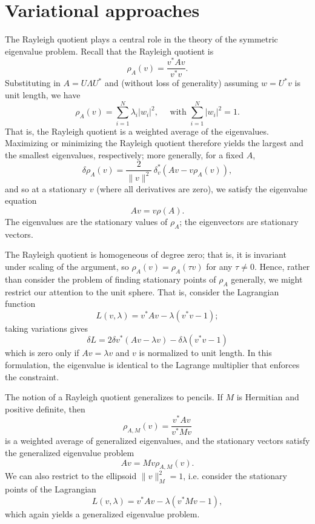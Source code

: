 \documentclass[12pt, leqno]{article} %
\begin{document}
\section{Variational approaches}


The Rayleigh quotient plays a central role in the theory of the
symmetric eigenvalue problem.  Recall that the Rayleigh quotient is
\[
  \rho_A(v) = \frac{v^* A v}{v^* v}.
\]
Substituting in $A = U \Lambda U^*$ and (without loss of generality)
assuming $w = U^* v$ is unit length, we have
\[
  \rho_A(v) = \sum_{i=1}^N \lambda_i |w_i|^2, \quad
  \mbox{ with } \sum_{i=1}^N |w_i|^2 = 1.
\]
That is, the Rayleigh quotient is a weighted average of the eigenvalues.
Maximizing or minimizing the Rayleigh quotient therefore yields the
largest and the smallest eigenvalues, respectively; more generally,
for a fixed $A$,
\[
  \delta \rho_A(v) = \frac{2}{\|v\|^2} \, \delta_v^* \left( A v - v \rho_A(v) \right),
\]
and so at a stationary $v$ (where all derivatives are zero),
we satisfy the eigenvalue equation
\[
  Av = v \rho(A).
\]
The eigenvalues are the stationary values of $\rho_A$; the eigenvectors
are stationary vectors.

The Rayleigh quotient is homogeneous of degree zero; that is, it is
invariant under scaling of the argument, so $\rho_A(v) = \rho_A(\tau v)$
for any $\tau \neq 0$.  Hence, rather than consider the problem of
finding stationary points of $\rho_A$ generally, we might restrict our
attention to the unit sphere.  That is, consider the Lagrangian function
\[
  L(v,\lambda) = v^* A v - \lambda (v^* v - 1);
\]
taking variations gives
\[
  \delta L = 2 \delta v^* (Av -\lambda v) - \delta \lambda (v^* v - 1)
\]
which is zero only if $Av = \lambda v$ and $v$ is normalized to unit
length.  In this formulation, the eigenvalue is identical to the
Lagrange multiplier that enforces the constraint.

The notion of a Rayleigh quotient generalizes to pencils.
If $M$ is Hermitian and positive definite, then
\[
  \rho_{A,M}(v) = \frac{v^* A v}{v^* M v}
\]
is a weighted average of generalized eigenvalues, and the stationary
vectors satisfy the generalized eigenvalue problem
\[
  Av = Mv \rho_{A,M}(v).
\]
We can also restrict to the ellipsoid $\|v\|_M^2 = 1$, i.e. consider
the stationary points of the Lagrangian
\[
  L(v,\lambda) = v^* A v - \lambda (v^* M v - 1),
\]
which again yields a generalized eigenvalue problem.
\end{document}
